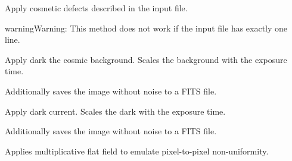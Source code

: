 \documentclass[a4paper,11pt,english]{sphinxmanual}
\begin{document}
\begin{fulllineitems}
\begin{fulllineitems}
\begin{quote}
\begin{description}
\end{description}\end{quote}

\end{fulllineitems}


\begin{fulllineitems}
\label{simulator:simulator.simulator.VISsimulator.applyCosmetics}
Apply cosmetic defects described in the input file.

\begin{notice}{warning}{Warning:}
This method does not work if the input file has exactly one line.
\end{notice}

\end{fulllineitems}


\begin{fulllineitems}
\label{simulator:simulator.simulator.VISsimulator.applyCosmicBackground}
Apply dark the cosmic background. Scales the background with the exposure time.

Additionally saves the image without noise to a FITS file.

\end{fulllineitems}


\begin{fulllineitems}
\label{simulator:simulator.simulator.VISsimulator.applyDarkCurrent}
Apply dark current. Scales the dark with the exposure time.

Additionally saves the image without noise to a FITS file.

\end{fulllineitems}


\begin{fulllineitems}
\label{simulator:simulator.simulator.VISsimulator.applyFlatfield}
Applies multiplicative flat field to emulate pixel-to-pixel non-uniformity.


\end{fulllineitems}
\end{fulllineitems}
\end{document}
